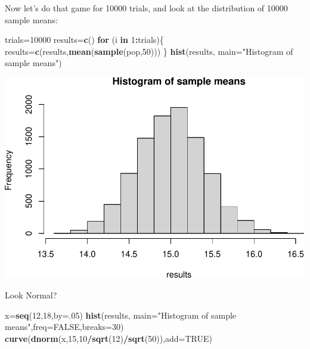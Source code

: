 \documentclass[
]{book}
\newenvironment{Shaded}{\begin{snugshade}}{\end{snugshade}}
\newcommand{\AttributeTok}[1]{\textcolor[rgb]{0.13,0.29,0.53}{#1}}
\newcommand{\ConstantTok}[1]{\textcolor[rgb]{0.56,0.35,0.01}{#1}}
\newcommand{\ControlFlowTok}[1]{\textcolor[rgb]{0.13,0.29,0.53}{\textbf{#1}}}
\newcommand{\DecValTok}[1]{\textcolor[rgb]{0.00,0.00,0.81}{#1}}
\newcommand{\FunctionTok}[1]{\textcolor[rgb]{0.13,0.29,0.53}{\textbf{#1}}}
\newcommand{\NormalTok}[1]{#1}
\newcommand{\OtherTok}[1]{\textcolor[rgb]{0.56,0.35,0.01}{#1}}
\newcommand{\SpecialCharTok}[1]{\textcolor[rgb]{0.81,0.36,0.00}{\textbf{#1}}}
\newcommand{\StringTok}[1]{\textcolor[rgb]{0.31,0.60,0.02}{#1}}
\theoremstyle{definition}
\theoremstyle{definition}
\theoremstyle{definition}
\theoremstyle{definition}
\theoremstyle{remark}
\begin{document}
Now let's do that game for 10000 trials, and look at the distribution of 10000 sample means:

\begin{Shaded}
\begin{Highlighting}[]
\NormalTok{trials}\OtherTok{=}\DecValTok{10000}
\NormalTok{results}\OtherTok{=}\FunctionTok{c}\NormalTok{()}
\ControlFlowTok{for}\NormalTok{ (i }\ControlFlowTok{in} \DecValTok{1}\SpecialCharTok{:}\NormalTok{trials)\{}
\NormalTok{  results}\OtherTok{=}\FunctionTok{c}\NormalTok{(results,}\FunctionTok{mean}\NormalTok{(}\FunctionTok{sample}\NormalTok{(pop,}\DecValTok{50}\NormalTok{)))}
\NormalTok{\}}
\FunctionTok{hist}\NormalTok{(results, }\AttributeTok{main=}\StringTok{"Histogram of sample means"}\NormalTok{)}
\end{Highlighting}
\end{Shaded}

\includegraphics{math340-notes_files/figure-latex/unnamed-chunk-173-1.pdf}

Look Normal?

\begin{Shaded}
\begin{Highlighting}[]
\NormalTok{x}\OtherTok{=}\FunctionTok{seq}\NormalTok{(}\DecValTok{12}\NormalTok{,}\DecValTok{18}\NormalTok{,}\AttributeTok{by=}\NormalTok{.}\DecValTok{05}\NormalTok{)}
\FunctionTok{hist}\NormalTok{(results, }\AttributeTok{main=}\StringTok{"Histogram of sample means"}\NormalTok{,}\AttributeTok{freq=}\ConstantTok{FALSE}\NormalTok{,}\AttributeTok{breaks=}\DecValTok{30}\NormalTok{)}
\FunctionTok{curve}\NormalTok{(}\FunctionTok{dnorm}\NormalTok{(x,}\DecValTok{15}\NormalTok{,}\DecValTok{10}\SpecialCharTok{/}\FunctionTok{sqrt}\NormalTok{(}\DecValTok{12}\NormalTok{)}\SpecialCharTok{/}\FunctionTok{sqrt}\NormalTok{(}\DecValTok{50}\NormalTok{)),}\AttributeTok{add=}\ConstantTok{TRUE}\NormalTok{)}
\end{Highlighting}
\end{Shaded}
\end{document}
